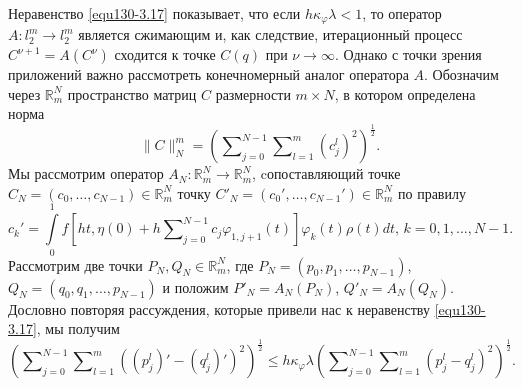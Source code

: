 Неравенство \eqref{equ130-3.17} показывает, что если $h\kappa_\varphi\lambda<1$, то оператор  $A:l_2^m\to l_2^m$ является сжимающим и, как следствие, итерационный процесс $C^{\nu+1}=A(C^{\nu})$  сходится к точке $C(q)$ при $\nu\to\infty$. Однако с точки зрения приложений важно рассмотреть конечномерный аналог оператора $A$. Обозначим через $\mathbb{R}^N_m$ пространство матриц $C$ размерности $m\times N$, в котором определена норма
$$\|C\|_N^m=\left(\sum\nolimits_{j=0}^{N-1} \sum\nolimits_{l=1}^{m}(c_j^l)^2\right)^\frac12.$$
 Мы рассмотрим оператор $A_N:\mathbb{R}^N_m\to \mathbb{R}^N_m$, cопоставляющий точке\\
$C_N=(c_0,\ldots,c_{N-1})\in \mathbb{R}^N_m $ точку  $C'_N=(c_0',\ldots,c_{N-1}')\in \mathbb{R}^N_m $ по правилу
\begin{equation}\label{equ130-3.18}
c_k'=\int\limits_{0}^1f\left[ht,\eta(0)+ h\sum\nolimits_{j=0}^{N-1} c_j\varphi_{1,j+1}(t)\right]\varphi_k(t)\rho(t) dt,\,k=0,1,\ldots, N-1.
\end{equation}
 Рассмотрим две точки $P_N,Q_N\in \mathbb{R}^N_m$, где $P_N=(p_0,p_1,\ldots,p_{N-1})$,\\   $Q_N=(q_0,q_1,\ldots,p_{N-1})$ и положим $P'_N=A_N(P_N)$, $Q'_N=A_N(Q_N)$. Дословно повторяя рассуждения, которые привели нас к неравенству \eqref{equ130-3.17}, мы получим
\begin{equation}\label{equ130-3.19}
\left(\sum\nolimits_{j=0}^{N-1}\sum\nolimits_{l=1}^m((p^l_j)'-(q^l_j)')^2\right)^\frac12\le h\kappa_\varphi\lambda \left(\sum\nolimits_{j=0}^{N-1}\sum\nolimits_{l=1}^m( p^l_j-q^l_j)^2\right)^\frac12.
\end{equation}

